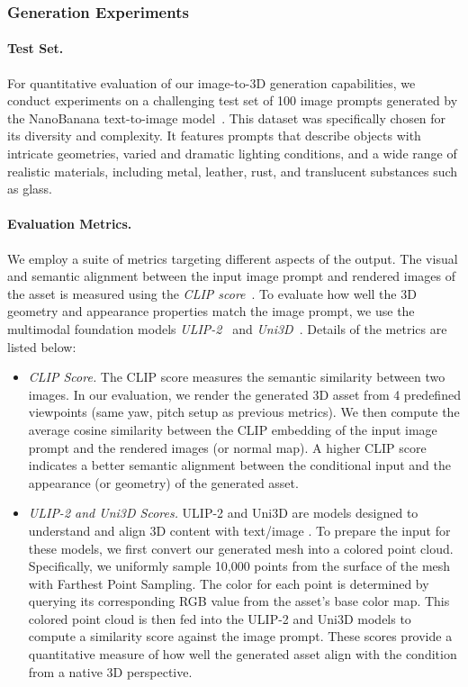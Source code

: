 \documentclass[10pt,twocolumn,letterpaper]{article}
\begin{document}
\subsubsection{Generation Experiments}

\paragraph{Test Set.}
For quantitative evaluation of our image-to-3D generation capabilities, we conduct experiments on a challenging test set of 100 image prompts generated by the NanoBanana text-to-image model~\cite{fortin2025nanobanana}. This dataset was specifically chosen for its diversity and complexity. It features prompts that describe objects with intricate geometries, varied and dramatic lighting conditions, and a wide range of realistic materials, including metal, leather, rust, and translucent substances such as glass.

\paragraph{Evaluation Metrics.}
We employ a suite of metrics targeting different aspects of the output. The visual and semantic alignment between the input image prompt and rendered images of the asset is measured using the \emph{CLIP score}~\cite{radford2021learning}. To evaluate how well the 3D geometry and appearance properties match the image prompt, we use the multimodal foundation models \emph{ULIP-2}~\cite{xue2024ulip} and \emph{Uni3D}~\cite{zhou2023uni3d}. Details of the metrics are listed below:
\begin{itemize}
    \item \emph{CLIP Score.} The CLIP score measures the semantic similarity between two images. In our evaluation, we render the generated 3D asset from 4 predefined viewpoints (same yaw, pitch setup as previous metrics). We then compute the average cosine similarity between the CLIP embedding of the input image prompt and the rendered images (or normal map). A higher CLIP score indicates a better semantic alignment between the conditional input and the appearance (or geometry) of the generated asset.
    \item \emph{ULIP-2 and Uni3D Scores.} ULIP-2 and Uni3D are models designed to understand and align 3D content with text/image . To prepare the input for these models, we first convert our generated mesh into a colored point cloud. Specifically, we uniformly sample 10,000 points from the surface of the mesh with Farthest Point Sampling. The color for each point is determined by querying its corresponding RGB value from the asset's base color map. This colored point cloud is then fed into the ULIP-2 and Uni3D models to compute a similarity score against the image prompt. These scores provide a quantitative measure of how well the generated asset align with the condition from a native 3D perspective.
\end{itemize}
\end{document}
